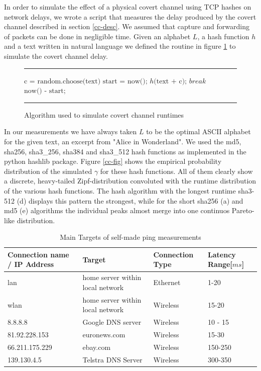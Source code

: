 \documentclass[12pt,a4paper,automark, toc=bib]{scrreprt}
\theoremstyle{definition}
\begin{document}
			\label{script}
			In order to simulate the effect of a physical covert channel using TCP hashes on network delays, we wrote a script that measures the delay produced by the covert channel described in section \ref{cc-desc}. We assumed that capture and forwarding of packets can be done in negligible time. Given an alphabet $L$, a hash function $h$ and a text written in natural language we defined the routine in figure \ref{cov.sim} to simulate the covert channel delay.\\
			\begin{figure}[t]
				\rule{\linewidth}{0.4pt}
				\begin{algorithmic}[1]
					\State $\text{c = random.choose(text)}$
					\State $\text{start = now();}$
					\State $h\text{(text + c);}$
					\State $break$
					\EndIf
					\EndFor
					\State \Return $\text{now() - start;}$
				\end{algorithmic}
				\rule{\linewidth}{0.4pt}
				\caption{Algorithm used to simulate covert channel runtimes}
				\label{cov.sim}
			\end{figure}
			In our measurements we have always taken $L$ to be the optimal ASCII alphabet for the given text, an excerpt from "Alice in Wonderland". We used the md5, sha256, sha3\_256,
			sha384 and sha3\_512 hash functions as implemented in the python hashlib package. Figure \ref{cc-fig} shows the empirical probability distribution of the simulated $\gamma$ for these hash functions. All of them clearly show a discrete, heavy-tailed Zipf-distribution convoluted with the runtime distribution of the various hash functions. The hash algorithm with the longest runtime sha3-512 (d) displays this pattern the strongest, while for the short sha256 (a) and md5 (e) algorithms the individual peaks almost merge into one continuos Pareto-like distribution.
			
			\begin{table}
				\begin{tabular}{|m{3cm}|m{6cm}|m{2.5cm}|m{3cm}|}
					\hline
					Connection name / IP Address & Target & Connection Type & Latency Range[$ms$] \\
					\hline
					\hline
					lan & home server within local network & Ethernet & 1-20 \\
					\hline
					wlan & home server within local network & Wireless & 15-20 \\
					\hline
					8.8.8.8 & Google DNS server& Wireless & 10 - 15 \\
					\hline
					81.92.228.153 & euronews.com & Wireless & 15-30 \\
					\hline
					66.211.175.229 & ebay.com & Wireless & 150-250 \\
					\hline
					139.130.4.5 & Telstra DNS Server & Wireless & 300-350 \\
					
					\hline
				\end{tabular}
				\caption{Main Targets of self-made ping measurements}
				\label{connections-tab}
			\end{table}
			
\end{document}
